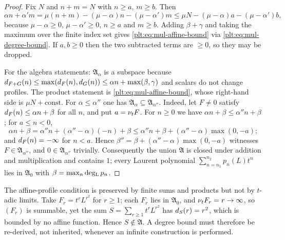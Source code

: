 \begin{proof}
Fix $N$ and $n+m=N$ with $n\ge a$, $m\ge b$.  Then
\[
 \alpha n+\alpha'm
 =\mu(n+m)-(\mu-\alpha)n-(\mu-\alpha')m
 \le\mu N-(\mu-\alpha)a-(\mu-\alpha')b,
\]
because $\mu-\alpha\ge0$, $\mu-\alpha'\ge0$, $n\ge a$ and $m\ge b$.  Adding
$\beta+\gamma$ and taking the maximum over the finite index set gives
\eqref{plt:eq:mul-affine-bound} via \eqref{plt:eq:mul-degree-bound}.  If
$a,b\ge0$ then the two subtracted terms are $\ge0$, so they may be dropped.

For the algebra statements: $\mathfrak A_\alpha$ is a subspace because
$d_{F+G}(n)\le\max(d_{F}(n),d_{G}(n))
\le\alpha n+\max(\beta,\gamma)$ and scalars do not change profiles.  The
product statement is \eqref{plt:eq:mul-affine-bound}, whose right-hand side is
$\mu N+\text{const}$.
For $\alpha\le\alpha''$ one has $\mathfrak A_\alpha\subseteq\mathfrak
A_{\alpha''}$.  Indeed, let $F\ne0$ satisfy $d_{F}(n)\le\alpha n+\beta$
for all $n$, and put $a=\nu_{t} F$.  For $n\ge0$ we have
$\alpha n+\beta\le\alpha''n+\beta$; for $a\le n<0$,
\[
 \alpha n+\beta=\alpha''n+(\alpha''-\alpha)(-n)+\beta
 \le\alpha''n+\beta+(\alpha''-\alpha)\max(0,-a);
\]
and $d_{F}(n)=-\infty$ for $n<a$.  Hence
$\beta''=\beta+(\alpha''-\alpha)\max(0,-a)$ witnesses
$F\in\mathfrak A_{\alpha''}$, and $0\in\mathfrak A_{\alpha''}$ trivially.
Consequently the union $\mathfrak A$ is closed under
addition and multiplication and contains $1$; every Laurent polynomial
$\sum_{n=n_1}^{n_2}p_n(L)t^n$ lies in $\mathfrak A_0$ with
$\beta=\max_n\operatorname{deg_{L}} p_n$.
\end{proof}

\begin{remark}
\label{plt:rmk:mul-profile-not-closed}
The affine-profile condition is preserved by finite sums and products but not
by $t$-adic limits.  Take $F_r=t^rL^{r^2}$ for $r\ge1$; each $F_r$ lies in
$\mathfrak A_0$, and $\nu_{t} F_r=r\to\infty$, so $(F_r)$ is summable, yet the
sum
$S=\sum_{r\ge1}t^rL^{r^2}$ has $d_{S}(r)=r^2$, which is bounded by no
affine function.  Hence $S\notin\mathfrak A$.  A degree bound must therefore
be re-derived, not inherited, whenever an infinite construction is performed.
\end{remark}

